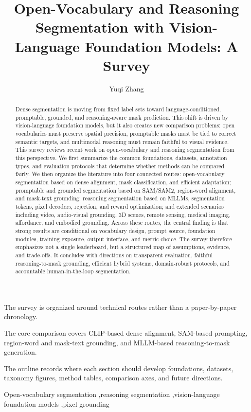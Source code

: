 \documentclass[final,5p,number,sort&compress]{elsarticle}
\begin{document}
\begin{frontmatter}

\title{Open-Vocabulary and Reasoning Segmentation with Vision-Language Foundation Models: A Survey}

\author{Yuqi Zhang}

\begin{abstract}
Dense segmentation is moving from fixed label sets toward language-conditioned, promptable, grounded, and reasoning-aware mask prediction. This shift is driven by vision-language foundation models, but it also creates new comparison problems: open vocabularies must preserve spatial precision, promptable masks must be tied to correct semantic targets, and multimodal reasoning must remain faithful to visual evidence. This survey reviews recent work on open-vocabulary and reasoning segmentation from this perspective. We first summarize the common foundations, datasets, annotation types, and evaluation protocols that determine whether methods can be compared fairly. We then organize the literature into four connected routes: open-vocabulary segmentation based on dense alignment, mask classification, and efficient adaptation; promptable and grounded segmentation based on SAM/SAM2, region-word alignment, and mask-text grounding; reasoning segmentation based on MLLMs, segmentation tokens, pixel decoders, rejection, and reward optimization; and extended scenarios including video, audio-visual grounding, 3D scenes, remote sensing, medical imaging, affordance, and embodied grounding. Across these routes, the central finding is that strong results are conditional on vocabulary design, prompt source, foundation modules, training exposure, output interface, and metric choice. The survey therefore emphasizes not a single leaderboard, but a structured map of assumptions, evidence, and trade-offs. It concludes with directions on transparent evaluation, faithful reasoning-to-mask grounding, efficient hybrid systems, domain-robust protocols, and accountable human-in-the-loop segmentation.
\end{abstract}

\begin{highlights}
\item The survey is organized around technical routes rather than a paper-by-paper chronology.
\item The core comparison covers CLIP-based dense alignment, SAM-based prompting, region-word and mask-text grounding, and MLLM-based reasoning-to-mask generation.
\item The outline records where each section should develop foundations, datasets, taxonomy figures, method tables, comparison axes, and future directions.
\end{highlights}

\begin{keyword}
Open-vocabulary segmentation \sep reasoning segmentation \sep vision-language foundation models \sep pixel grounding
\end{keyword}

\end{frontmatter}
\end{document}
